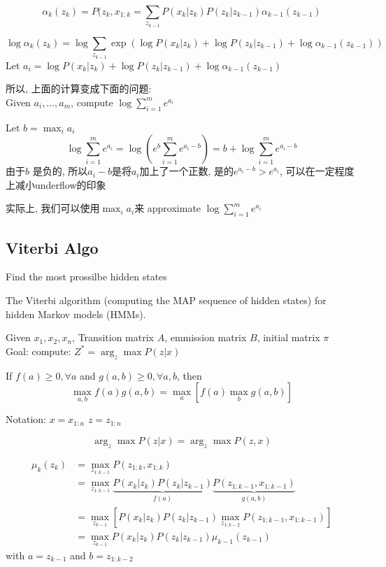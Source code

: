 \documentclass{article}
\begin{document}
$$\alpha_k(z_k) = P(z_k, x_{1:k} = \sum_{z_{k-1}} P(x_k | z_k)P(z_k|z_{k-1}) \alpha_{k-1}(z_{k-1})$$

$$\log \alpha_k(z_k) = \log \sum_{z_{k-1}} \exp(\log P(x_k | z_k) + \log P(z_k|z_{k-1}) + \log \alpha_{k-1}(z_{k-1}))$$
Let $a_i = \log P(x_k | z_k) + \log P(z_k|z_{k-1}) + \log \alpha_{k-1}(z_{k-1})$

\noindent
所以, 上面的计算变成下面的问题:\\
Given $a_i, \ldots, a_m$, compute $\log \sum_{i=1}^m e^{a_i}$

Let $b = \max_i a_i$
$$
\log \sum_{i=1}^m e^{a_i}
= \log (e^b \sum_{i=1}^m e^{a_i - b})
= b + \log \sum_{i=1}^m e^{a_i - b}
$$
由于$b$ 是负的, 所以$a_i -b$是将$a_i$加上了一个正数, 是的$e^{a_i- b} > e^{a_i}$, 可以在一定程度上减小underflow的印象

实际上, 我们可以使用$\max_i a_i$来 approximate $\log \sum_{i=1}^m e^{a_i}$

\subsection{Viterbi Algo}
Find the most prossilbe hidden states

The Viterbi algorithm (computing the MAP sequence of hidden states) for hidden Markov models (HMMs).

\noindent
Given $x_1, x_2, x_n$, Transition matrix $A$, emmission matrix $B$, initial matrix $\pi$\\
Goal: compute: $Z^* =\arg_z \max P(z|x)$

\begin{remark}
If $f(a) \geq 0, \forall a$ and $g(a,b) \geq 0, \forall a,b$, then
$$\max_{a,b} f(a)g(a,b) = \max_a [f(a) \max_b g(a,b)]$$
\end{remark}

Notation: 
$x = x_{1:n}$
$z = z_{1:n}$

$$\arg_z \max P(z|x) = \arg_z \max P(z,x)$$

$$
\begin{aligned}
\mu_k(z_k)
& = \max_{z_{1:k-1}} P(z_{1:k}, x_{1:k}) \\ 
& = \max_{z_{1:k-1}} \underbrace{P(x_k|z_k) P(z_k|z_{k-1})}_{f(a)} \underbrace{P(z_{1:k-1}, x_{1:k-1})}_{g(a,b)} \\ 
& = \max_{z_{k-1}} [P(x_k|z_k) P(z_k|z_{k-1}) \max_{z_{1:k-2}} P(z_{1:k-1}, x_{1:k-1})] \\ 
& = \max_{z_{k-1}} P(x_k|z_k) P(z_k|z_{k-1}) \mu_{k-1}(z_{k-1})
\end{aligned}
$$
with $a = z_{k-1}$ and $b = z_{1:k-2}$
\end{document}
